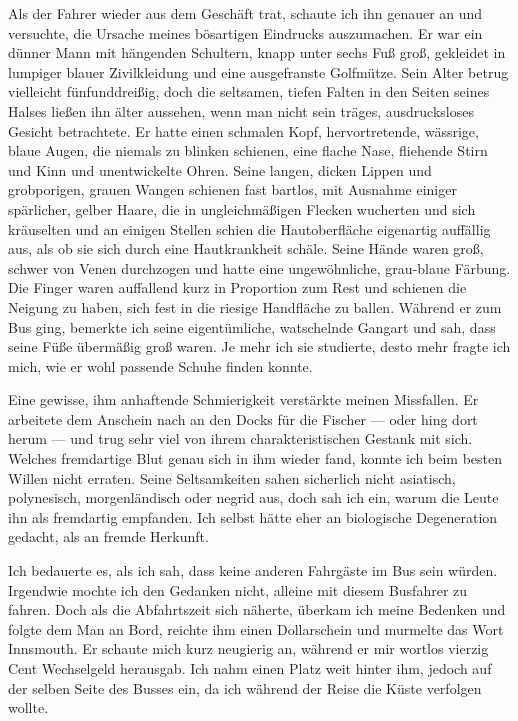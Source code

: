 Als der Fahrer wieder aus dem Geschäft trat, schaute ich ihn genauer an und versuchte, die Ursache meines bösartigen Eindrucks auszumachen. Er war ein dünner Mann mit hängenden Schultern, knapp unter sechs Fuß groß, gekleidet in lumpiger blauer Zivilkleidung und eine ausgefranste Golfmütze. Sein Alter betrug vielleicht fünfunddreißig, doch die seltsamen, tiefen Falten in den Seiten seines Halses ließen ihn  älter aussehen, wenn man nicht sein träges, ausdrucksloses Gesicht betrachtete. Er hatte einen schmalen Kopf, hervortretende, wässrige, blaue Augen, die niemals zu blinken schienen, eine flache Nase, fliehende Stirn und Kinn und unentwickelte Ohren. Seine langen, dicken Lippen und grobporigen, grauen Wangen schienen fast bartlos, mit Ausnahme einiger spärlicher, gelber Haare, die in ungleichmäßigen Flecken wucherten und sich kräuselten und an einigen Stellen schien die Hautoberfläche eigenartig auffällig aus, als ob sie sich durch eine Hautkrankheit schäle. Seine Hände waren groß, schwer von Venen durchzogen und hatte eine ungewöhnliche, grau-blaue Färbung. Die Finger waren auffallend kurz in Proportion zum Rest und schienen die Neigung zu haben, sich fest in die riesige Handfläche zu ballen. Während er zum Bus ging, bemerkte ich seine eigentümliche, watschelnde Gangart und sah, dass seine Füße übermäßig groß waren. Je mehr ich sie studierte, desto mehr fragte ich mich, wie er wohl passende Schuhe finden konnte.

Eine gewisse, ihm anhaftende Schmierigkeit verstärkte meinen Missfallen. Er arbeitete dem Anschein nach an den Docks für die Fischer --- oder hing dort herum --- und trug sehr viel von ihrem charakteristischen Gestank mit sich. Welches fremdartige Blut genau sich in ihm wieder fand, konnte ich beim besten Willen nicht erraten. Seine Seltsamkeiten sahen sicherlich nicht asiatisch, polynesisch, morgenländisch oder negrid aus, doch sah ich ein, warum die Leute ihn als fremdartig empfanden. Ich selbst hätte eher an biologische Degeneration gedacht, als an fremde Herkunft.

Ich bedauerte es, als ich sah, dass keine anderen Fahrgäste im Bus sein würden. Irgendwie mochte ich den Gedanken nicht, alleine mit diesem Busfahrer zu fahren. Doch als die Abfahrtszeit sich näherte, überkam ich meine Bedenken und folgte dem Man an Bord, reichte ihm einen Dollarschein und murmelte das Wort \glqq Innsmouth\grqq. Er schaute mich kurz neugierig an, während er mir wortlos vierzig Cent Wechselgeld herausgab. Ich nahm einen Platz weit hinter ihm, jedoch auf der selben Seite des Busses ein, da ich während der Reise die Küste verfolgen wollte.

